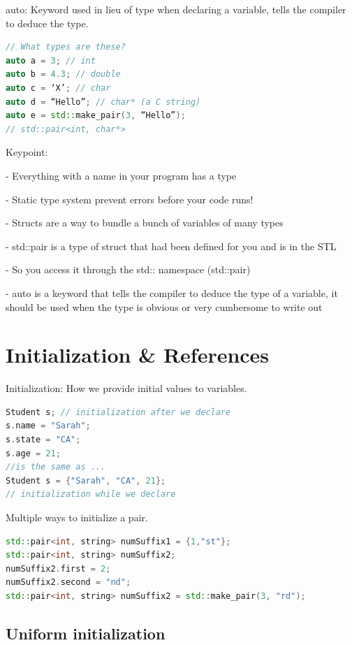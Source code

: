 \documentclass[12pt, a4paper, oneside]{ctexbook}
\begin{document}
auto: Keyword used in
lieu of type when
declaring a variable, tells
the compiler to deduce
the type.

\begin{lstlisting}[language=c++]
// What types are these?
auto a = 3; // int
auto b = 4.3; // double
auto c = ‘X’; // char
auto d = “Hello”; // char* (a C string)
auto e = std::make_pair(3, “Hello”);
// std::pair<int, char*>
\end{lstlisting}

Keypoint:

- Everything with a name in your program has a type

- Static type system prevent errors before your code runs!

- Structs are a way to bundle a bunch of variables of many
types

- std::pair is a type of struct that had been defined for you
and is in the STL

- So you access it through the std:: namespace (std::pair)

- auto is a keyword that tells the compiler to deduce the
type of a variable, it should be used when the type is
obvious or very cumbersome to write out

\section{Initialization \& References}

Initialization: How we
provide initial
values to variables.

\begin{lstlisting}[language=c++]
Student s; // initialization after we declare
s.name = "Sarah";
s.state = "CA";
s.age = 21;
//is the same as ...
Student s = {"Sarah", "CA", 21};
// initialization while we declare
\end{lstlisting}

Multiple ways to initialize a pair.

\begin{lstlisting}[language=c++]
std::pair<int, string> numSuffix1 = {1,"st"};
std::pair<int, string> numSuffix2;
numSuffix2.first = 2;
numSuffix2.second = "nd";
std::pair<int, string> numSuffix2 = std::make_pair(3, "rd");
\end{lstlisting}

\subsection{Uniform initialization}
\end{document}
